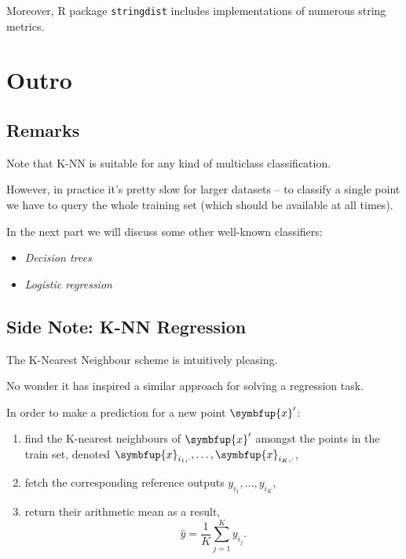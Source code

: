 \documentclass[10pt,b5paper,krantz1]{krantz}
\providecommand{\tightlist}{%
  \setlength{\itemsep}{0pt}\setlength{\parskip}{0pt}}
\renewcommand{\mathbf}[1]{\symbfup{#1}}
\begin{document}
Moreover, R package \texttt{stringdist} includes implementations
of numerous string metrics.

\hypertarget{outro-2}{%
\section{Outro}\label{outro-2}}

\hypertarget{remarks-2}{%
\subsection{Remarks}\label{remarks-2}}

Note that K-NN is suitable for any kind of multiclass classification.

However, in practice it's pretty slow for larger datasets -- to
classify a single point we have to query the whole training set (which
should be available at all times).

In the next part we will discuss some other well-known classifiers:

\begin{itemize}
\tightlist
\item
  \emph{Decision trees}
\item
  \emph{Logistic regression}
\end{itemize}

\hypertarget{side-note-k-nn-regression}{%
\subsection{Side Note: K-NN Regression}\label{side-note-k-nn-regression}}

The K-Nearest Neighbour scheme is intuitively pleasing.

No wonder it has inspired a similar approach for solving a regression task.

In order to make a prediction for a new point \(\mathbf{x}'\):

\begin{enumerate}
\def\labelenumi{\arabic{enumi}.}
\tightlist
\item
  find the K-nearest neighbours of \(\mathbf{x}'\) amongst the points in the train set,
  denoted \(\mathbf{x}_{i_1,\cdot}, \dots, \mathbf{x}_{i_K,\cdot}\),
\item
  fetch the corresponding reference outputs \(y_{i_1}, \dots, y_{i_K}\),
\item
  return their arithmetic mean as a result,
  \[\hat{y}=\frac{1}{K} \sum_{j=1}^K y_{i_j}.\]
\end{enumerate}
\end{document}

